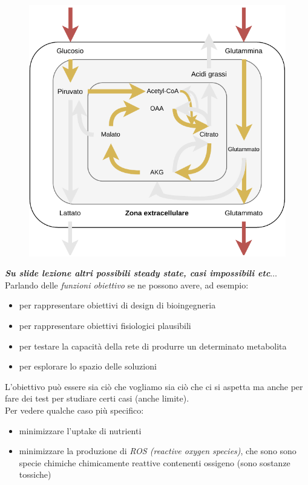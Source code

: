 \documentclass[a4paper,12pt, oneside]{book}
\begin{document}
\begin{figure}[H]
  \centering
  \includegraphics[scale = 0.8]{img/toy4.pdf}
\end{figure}
\textbf{\textit{Su slide lezione altri possibili steady state, casi impossibili etc$\ldots$}}\\
Parlando delle \textit{funzioni obiettivo} se ne possono avere, ad esempio:
\begin{itemize}
  \item per rappresentare obiettivi di design di bioingegneria
  \item per rappresentare obiettivi fisiologici plausibili
  \item per testare la capacità della rete di produrre un determinato metabolita
  \item per esplorare lo spazio delle soluzioni
\end{itemize}
L'obiettivo può essere sia ciò che vogliamo sia ciò che ci si aspetta ma anche
per fare dei test per studiare certi casi (anche limite).\\
Per vedere qualche caso più specifico:
\begin{itemize}
  \item minimizzare l'uptake di nutrienti
  \item minimizzare la produzione di \textit{ROS (reactive oxygen species)}, che
  sono sono specie chimiche chimicamente reattive contenenti ossigeno (sono
  sostanze tossiche)
\end{itemize}
\end{document}
